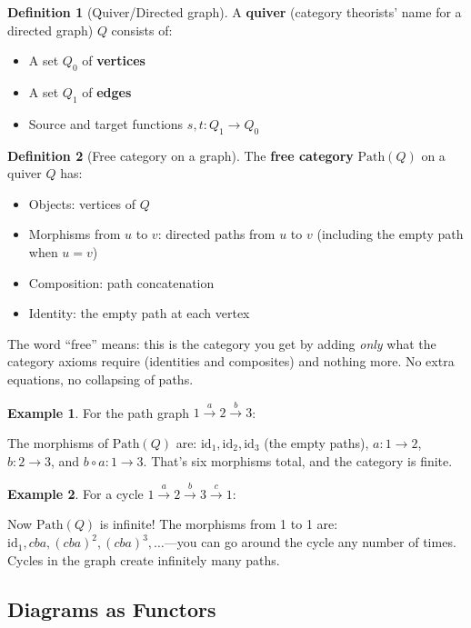 \documentclass[11pt]{article}
\newcommand{\id}{\mathrm{id}}
\theoremstyle{definition}
\newtheorem{definition}{Definition}[section]
\newtheorem{example}{Example}[section]
\theoremstyle{plain}
\theoremstyle{remark}
\begin{document}
\begin{definition}[Quiver/Directed graph]
A \textbf{quiver} (category theorists' name for a directed graph) $Q$ consists of:
\begin{itemize}
  \item A set $Q_0$ of \textbf{vertices}
  \item A set $Q_1$ of \textbf{edges}
  \item Source and target functions $s, t: Q_1 \to Q_0$
\end{itemize}
\end{definition}

\begin{definition}[Free category on a graph]
The \textbf{free category} $\text{Path}(Q)$ on a quiver $Q$ has:
\begin{itemize}
  \item Objects: vertices of $Q$
  \item Morphisms from $u$ to $v$: directed paths from $u$ to $v$ (including the empty path when $u = v$)
  \item Composition: path concatenation
  \item Identity: the empty path at each vertex
\end{itemize}
\end{definition}

The word ``free'' means: this is the category you get by adding \emph{only} what the category axioms require (identities and composites) and nothing more. No extra equations, no collapsing of paths.

\begin{example}
For the path graph $1 \xrightarrow{a} 2 \xrightarrow{b} 3$:

The morphisms of $\text{Path}(Q)$ are: $\id_1, \id_2, \id_3$ (the empty paths), $a: 1 \to 2$, $b: 2 \to 3$, and $b \circ a: 1 \to 3$. That's six morphisms total, and the category is finite.
\end{example}

\begin{example}
For a cycle $1 \xrightarrow{a} 2 \xrightarrow{b} 3 \xrightarrow{c} 1$:

Now $\text{Path}(Q)$ is infinite! The morphisms from 1 to 1 are: $\id_1, cba, (cba)^2, (cba)^3, \ldots$---you can go around the cycle any number of times. Cycles in the graph create infinitely many paths.
\end{example}

\subsection{Diagrams as Functors}
\end{document}
